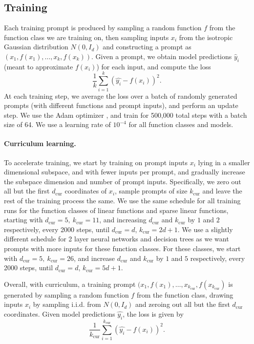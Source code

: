 \subsection{Training}
\label{app:training}
Each training prompt is produced by sampling a random function $f$ from the function class we are training on, then sampling inputs $x_i$ from the isotropic Gaussian distribution $N(0, I_d)$ and constructing a prompt as $(x_1, f(x_1),\ldots,x_k, f(x_{k}))$.
Given a prompt, we obtain model predictions $\hat y_i$ (meant to approximate $f(x_i)$) for each input, and compute the loss
\[
    \frac{1}{k} \sum_{i=1}^k \left(\hat{y_i}-f(x_i)\right)^2.
\]
At each training step, we average the loss over a batch of randomly generated prompts (with different functions and prompt inputs), and perform an update step.
We use the Adam optimizer \citep{kingma2014adam}, and train for 500,000 total steps with a batch size of 64. We use a learning rate of $10^{-4}$ for all function classes and models. 


\paragraph{Curriculum learning.} 
To accelerate training, we start by training on prompt inputs $x_i$ lying in a smaller dimensional subspace, and with fewer inputs per prompt, and gradually increase the subspace dimension and number of prompt inputs.
Specifically, we zero out all but the first $d_\text{cur}$ coordinates of $x_i$, sample prompts of size $k_\text{cur}$ and leave the rest of the training process the same.
We use the same schedule for all training runs for the function classes of linear functions and sparse linear functions, starting with $d_\text{cur} = 5,~ k_\text{cur} = 11$, and increasing $d_\text{cur}$ and $k_\text{cur}$ by $1$ and $2$ respectively, every 2000 steps, until $d_\text{cur} = d$, $k_\text{cur} = 2d+1$. We use a slightly different schedule for 2 layer neural networks and decision trees as we want prompts with more inputs for these function classes.
For these classes, we start with $d_\text{cur} = 5,~ k_\text{cur} = 26$, and increase $d_\text{cur}$ and $k_\text{cur}$ by $1$ and $5$ respectively, every 2000 steps, until $d_\text{cur} = d$, $k_\text{cur} = 5d+1$.

Overall, with curriculum, a training prompt $(x_1, f(x_1), \ldots, x_{k_\text{cur}}, f(x_{k_\text{cur}})$ is generated by sampling a random function $f$ from the function class,  drawing inputs $x_i$ by sampling i.i.d.  from $N(0, I_d)$ and zeroing out all but the first $d_\text{cur}$ coordinates. Given model predictions $\hat{y_i}$, the loss is given by 
\[
    \frac{1}{k_\text{cur}} \sum_{i=1}^{k_\text{cur}} \left(\hat{y_i}-f(x_i)\right)^2.
\]

